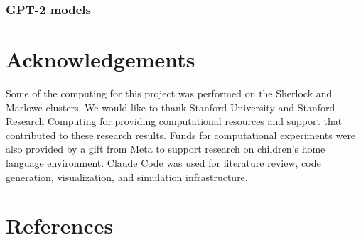 \documentclass[
  11pt,
]{article}
\begin{document}
\subsubsection{GPT-2 models}\label{gpt-2-models}

\section{Acknowledgements}\label{acknowledgements}

Some of the computing for this project was performed on the Sherlock and
Marlowe clusters. We would like to thank Stanford University and
Stanford Research Computing for providing computational resources and
support that contributed to these research results. Funds for
computational experiments were also provided by a gift from Meta to
support research on children's home language environment. Claude Code
was used for literature review, code generation, visualization, and
simulation infrastructure.

\section{References}\label{references}
\end{document}
